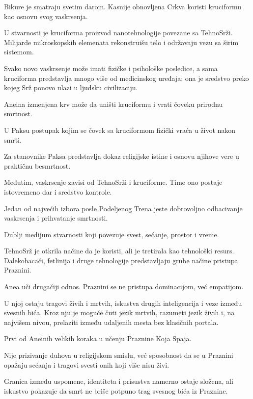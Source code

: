\begin{description}
  Bikure je smatraju svetim darom. Kasnije obnovljena Crkva koristi kruciformu kao osnovu svog vaskrsenja.

  U stvarnosti je kruciforma proizvod nanotehnologije povezane sa TehnoSrži. Milijarde mikroskopskih elemenata rekonstruišu telo i održavaju vezu sa širim sistemom.

  Svako novo vaskrsenje može imati fizičke i psihološke posledice, a sama kruciforma predstavlja mnogo više od medicinskog uređaja: ona je sredstvo preko kojeg Srž ponovo ulazi u ljudsku civilizaciju.

  Aneina izmenjena krv može da uništi kruciformu i vrati čoveku prirodnu smrtnost.


  \item[Vaskrsenje]
  U Paksu postupak kojim se čovek sa kruciformom fizički vraća u život nakon smrti.

  Za stanovnike Paksa predstavlja dokaz religijske istine i osnovu njihove vere u praktičnu besmrtnost.

  Međutim, vaskrsenje zavisi od TehnoSrži i kruciforme. Time ono postaje istovremeno dar i sredstvo kontrole.

  Jedan od najvećih izbora posle Podeljenog Trena jeste dobrovoljno odbacivanje vaskrsenja i prihvatanje smrtnosti.


  \item[Praznina Koja Spaja]
  Dublji medijum stvarnosti koji povezuje svest, sećanje, prostor i vreme.

  TehnoSrž je otkrila načine da je koristi, ali je tretirala kao tehnološki resurs. Dalekobacači, fetlinija i druge tehnologije predstavljaju grube načine pristupa Praznini.

  Anea uči drugačiji odnos. Praznini se ne pristupa dominacijom, već empatijom.

  U njoj ostaju tragovi živih i mrtvih, iskustva drugih inteligencija i veze između svesnih bića. Kroz nju je moguće čuti jezik mrtvih, razumeti jezik živih i, na najvišem nivou, prelaziti između udaljenih mesta bez klasičnih portala.


  \item[Jezik mrtvih]
  Prvi od Aneinih velikih koraka u učenju Praznine Koja Spaja.

  Nije prizivanje duhova u religijskom smislu, već sposobnost da se u Praznini opažaju sećanja i tragovi svesti onih koji više nisu živi.

  Granica između uspomene, identiteta i prisustva namerno ostaje složena, ali iskustvo pokazuje da smrt ne briše potpuno trag svesnog bića iz Praznine.



\end{description}
